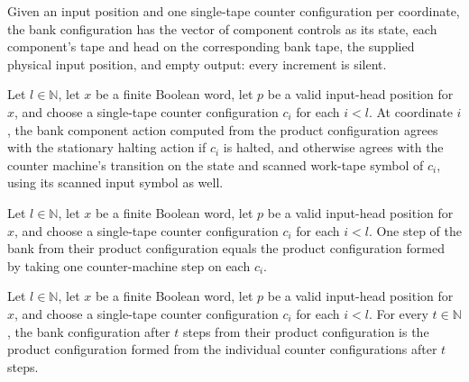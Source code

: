\begin{definition}
\label{Complexity.clBankCfg}
\leanok
{}
Given an input position and one single-tape counter configuration per coordinate, the bank configuration has the vector of component controls as its state, each component's tape and head on the corresponding bank tape, the supplied physical input position, and empty output: every increment is silent.
\end{definition}

\begin{lemma}
\label{Complexity.clBank_part}
\leanok
{}
Let $l\in\mathbb{N}$, let $x$ be a finite Boolean word, let $p$ be a valid input-head
position for $x$, and choose a single-tape counter configuration $c_i$ for each $i<l$.
At coordinate $i$, the bank component action computed from the product configuration
agrees with the stationary halting action if $c_i$ is halted, and otherwise agrees with
the counter machine's transition on the state and scanned work-tape symbol of $c_i$,
using its scanned input symbol as well.
\end{lemma}

\begin{lemma}
\label{Complexity.clBank_step}
\leanok
{}
Let $l\in\mathbb{N}$, let $x$ be a finite Boolean word, let $p$ be a valid input-head
position for $x$, and choose a single-tape counter configuration $c_i$ for each $i<l$.
One step of the bank from their product configuration equals the product configuration
formed by taking one counter-machine step on each $c_i$.
\end{lemma}

\begin{lemma}
\label{Complexity.clBank_run}
\leanok
{}
Let $l\in\mathbb{N}$, let $x$ be a finite Boolean word, let $p$ be a valid input-head
position for $x$, and choose a single-tape counter configuration $c_i$ for each $i<l$.
For every $t\in\mathbb{N}$, the bank configuration after $t$ steps from their product
configuration is the product configuration formed from the individual counter
configurations after $t$ steps.
\end{lemma}

